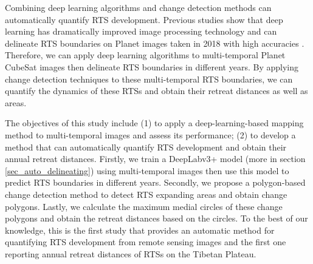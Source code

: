 \documentclass[authoryear,preprint,review,12pt]{elsarticle}
\begin{document}
Combining deep learning algorithms and change detection methods can automatically quantify RTS development.
Previous studies show that deep learning has dramatically improved image processing technology \citep{leCun2015Deep} and can delineate RTS boundaries on Planet images taken in 2018 with high accuracies \citep{huang2020using}. 
Therefore, we can apply deep learning algorithms to multi-temporal Planet CubeSat images then delineate RTS boundaries in different years.
By applying %
change detection techniques to these multi-temporal RTS boundaries, we can quantify the dynamics of these RTSs and obtain their retreat distances as well as areas. 


The objectives of this study include (1) to apply a deep-learning-based mapping method to multi-temporal images and assess its performance; (2) to develop a method that can automatically quantify RTS development 
and obtain their annual retreat distances.
Firstly, we train a DeepLabv3+ model (more in section \ref{sec_auto_delineating}) using multi-temporal images then use this model to predict RTS boundaries in different years.
Secondly, we propose a polygon-based change detection method to detect RTS expanding areas and obtain change polygons.
Lastly, we calculate the maximum medial circles of these change polygons and obtain the retreat distances based on the circles. 
To the best of our knowledge, this is the first study that provides an automatic method for quantifying RTS development from remote sensing images and the first one reporting annual retreat distances of RTSs on the Tibetan Plateau. 

\end{document}

